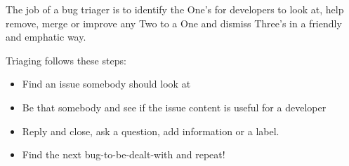 \documentclass[letterpaper,10pt,english]{sphinxmanual}
\begin{document}
The job of a bug triager is to identify the One’s for developers to look at, help remove, merge or improve any Two to a One and dismiss Three’s in a friendly and emphatic way.

Triaging follows these steps:
\begin{itemize}
\item {} 
Find an issue somebody should look at

\item {} 
Be that somebody and see if the issue content is useful for a developer

\item {} 
Reply and close, ask a question, add information or a label.

\item {} 
Find the next bug-to-be-dealt-with and repeat!

\end{itemize}
\end{document}
